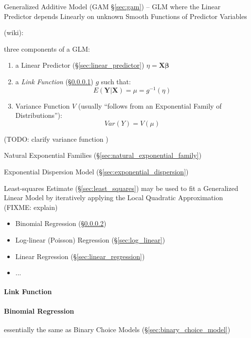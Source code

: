 \fist Generalized Additive Model (GAM \S\ref{sec:gam}) -- GLM where the Linear
Predictor depends Linearly on unknown Smooth Functions of Predictor Variables

(wiki):

three components of a GLM:
\begin{enumerate}
  \item a Linear Predictor (\S\ref{sec:linear_predictor})
    $\eta = \mathbf{X\beta}$
  \item a \emph{Link Function} (\S\ref{sec:link_function}) $g$ such that:
    \[
      E(\mathbf{Y}|\mathbf{X}) = \mu = g^{-1}(\eta)
    \]
  \item Variance Function $V$ (usually ``follows from an Exponential Family of
    Distributions''):
    \[
      Var(Y) = V(\mu)
    \]
\end{enumerate}
(TODO: clarify variance function )

Natural Exponential Families (\S\ref{sec:natural_exponential_family})

Exponential Dispersion Model (\S\ref{sec:exponential_dispersion})

Least-squares Estimate (\S\ref{sec:least_squares}) may be used to fit a
Generalized Linear Model by iteratively applying the Local Quadratic
Approximation (FIXME: explain)

\begin{itemize}
  \item Binomial Regression (\S\ref{sec:binomial_regression})
  \item Log-linear (Poisson) Regression (\S\ref{sec:log_linear})
  \item Linear Regression (\S\ref{sec:linear_regression})
  \item ...
\end{itemize}



\paragraph{Link Function}\label{sec:link_function}\hfill

\paragraph{Binomial Regression}\label{sec:binomial_regression}\hfill

essentially the same as Binary Choice Models (\S\ref{sec:binary_choice_model})



